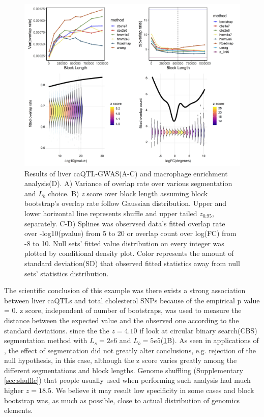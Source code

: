\begin{figure}[hbtp]
\centering%
\setlength{\abovecaptionskip}{-0.1cm}
\setlength{\belowcaptionskip}{-0.1cm}
\includegraphics[scale=0.25]{Figures/fig2.jpeg}
\caption{Results of liver caQTL-GWAS(A-C) and macrophage enrichment
  analysis(D). A) Variance of overlap rate over various segmentation
  and $L_b$ choice. B) {\it z} score over block length assuming block
  bootstrap's overlap rate follow Gaussian distribution. Upper and
  lower horizontal line represents shuffle and upper tailed
  $z_{0.95}$, separately. C-D) Splines was observsed data's fitted
  overlap rate over -log10(pvalue) from 5 to 20 or overlap count over
  log(FC) from -8 to 10. Null sets' fitted value distribution on every
  integer was plotted by conditional density plot. Color represents
  the amount of standard deviation(SD) that observed fitted statistics
  away from null sets' statistics distribution.}
\label{fig:result}
\vspace{-1.2cm}
\end{figure}

The scientific conclusion of this example was there exists a strong
association between liver caQTLs and total cholesterol SNPs because of
the empirical p value = 0. z score, independent of number of
bootstraps, was used to measure the distance between the expected
value and the observed one according to the standard deviations.
since the the $z = 4.10$ if look at circular binary search(CBS)
\citep{cbs} segmentation method with $L_s = 2e6$ and
$L_b=5e5$(\cref{fig:result}B).  As seen in applications of
\citet{bickel2010subsampling}, the effect of segmentation did not
greatly alter conclusions, e.g. rejection of the null hypothesis, in
this case, although the z score varies greatly among the different
segmentations and block lengths.  Genome shuffling (Supplementary
\cref{sec:shuffle}) that people usually used when performing such
analysis had much higher $z = 18.5$. We believe it may result low
specificity in some cases and block bootstrap was, as much as
possible, close to actual distribution of genomics elements.

